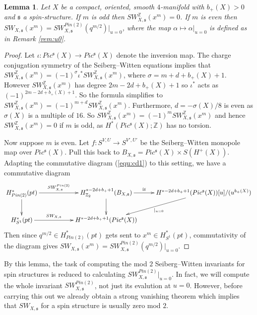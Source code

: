 \documentclass{amsart}
\newtheorem{lemma}[theorem]{Lemma}
\theoremstyle{definition}
\theoremstyle{remark}
\numberwithin{equation}{section}
\begin{document}
\begin{lemma}\label{lem:u=0}
Let $X$ be a compact, oriented, smooth $4$-manifold with $b_+(X) > 0$ and $\mathfrak{s}$ a spin-structure. If $m$ is odd then $SW^{\mathbb{Z}}_{X,\mathfrak{s}}(x^m) = 0$. If $m$ is even then $SW_{X,\mathfrak{s}}(x^m) = SW^{Pin(2)}_{X,\mathfrak{s}}(q^{m/2})|_{u=0}$, where the map $\alpha \mapsto \alpha|_{u=0}$ is defined as in Remark \ref{rem:u0}.
\end{lemma}
\begin{proof}
Let $\iota : Pic^{\mathfrak{s}}(X) \to Pic^{\mathfrak{s}}(X)$ denote the inversion map. The charge conjugation symmetry of the Seiberg--Witten equations implies that $SW_{X,\mathfrak{s}}^{\mathbb{Z}}( x^m) = (-1)^{\sigma} \iota^* SW_{X,\mathfrak{s}}^{\mathbb{Z}}(x^m)$, where $\sigma = m+d+b_+(X)+1$. However $SW_{X,\mathfrak{s}}^{\mathbb{Z}}(x^m)$ has degree $2m-2d+b_+(X)+1$ so $\iota^*$ acts as $(-1)^{2m-2d+b_+(X)+1}$. So the formula simplifies to  $SW_{X,\mathfrak{s}}^{\mathbb{Z}}( x^m) = (-1)^{m+d} SW_{X,\mathfrak{s}}^{\mathbb{Z}}(x^m)$. Furthermore, $d = -\sigma(X)/8$ is even as $\sigma(X)$ is a multiple of $16$. So $SW_{X,\mathfrak{s}}^{\mathbb{Z}}( x^m) = (-1)^{m} SW_{X,\mathfrak{s}}^{\mathbb{Z}}(x^m)$ and hence $SW_{X,\mathfrak{s}}^{\mathbb{Z}}(x^m) = 0$ if $m$ is odd, as $H^*( Pic^{\mathfrak{s}}(X) ; \mathbb{Z})$ has no torsion.

Now suppose $m$ is even. Let $f : S^{V,U} \to S^{V',U'}$ be the Seiberg--Witten monopole map over $Pic^{\mathfrak{s}}(X)$. Pull this back to $B_{X,\mathfrak{s}} = Pic^{\mathfrak{s}}(X) \times S(H^+(X))$. Adapting the commutative diagram (\ref{equ:cd1}) to this setting, we have a commutative diagram
\[
\xymatrix{
H^*_{Pin(2)}( pt ) \ar[rr]^-{SW^{Pin(2)}_{X,\mathfrak{s}}} \ar[d] & & H^{*-2d+b_++1}_{\mathbb{Z}_2}(B_{X,\mathfrak{s}}) \ar[d] \ar[r]^-{\cong} & H^{*-2d+b_++1}( Pic^{\mathfrak{s}}(X))[u]/(u^{b_+(X)}) \ar[dl]^-{ \; |_{u=0}}\\
H^*_{S^1}( pt ) \ar[rr]^-{SW_{X,\mathfrak{s}}} & & H^{*-2d+b_++1}( Pic^{\mathfrak{s}}(X)) & \\
}
\]
Then since $q^{m/2} \in H^*_{Pin(2)}(pt)$ gets sent to $x^m \in H^*_{S^1}( pt )$, commutativity of the diagram gives $SW_{X,\mathfrak{s}}(x^m) = SW^{Pin(2)}_{X,\mathfrak{s}}(q^{m/2})|_{u=0}$.
\end{proof}

By this lemma, the task of computing the mod $2$ Seiberg--Witten invariants for spin structures is reduced to calculating $SW^{Pin(2)}_{X,\mathfrak{s}}|_{u=0}$. In fact, we will compute the whole invariant $SW^{Pin(2)}_{X,\mathfrak{s}}$, not just its evalution at $u=0$. However, before carrying this out we already obtain a strong vanishing theorem which implies that $SW_{X,\mathfrak{s}}$ for a spin structure is usually zero mod $2$.
\end{document}
